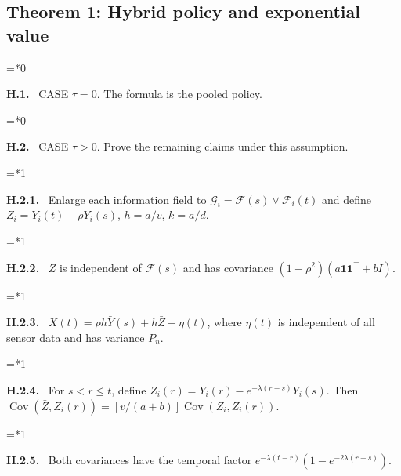 \documentclass[11pt,letterpaper]{article}
\newcommand{\Cov}{\operatorname{Cov}}
\newenvironment{proofstep}[2]{%
  \begin{list}{}{\leftmargin=\dimexpr 0.17in*#2\relax%
  \setlength{\rightmargin}{0pt}\setlength{\topsep}{5pt}\setlength{\parsep}{2pt}}%
  \item[]\textbf{\textcolor{ink}{#1.}}\ }{\end{list}}
\begin{document}
\subsection{Theorem 1: Hybrid policy and exponential value}
\begin{proofstep}{H.1}{0}
CASE $\tau=0$. The formula is the pooled policy.
\par\nopagebreak{}
\end{proofstep}
\begin{proofstep}{H.2}{0}
CASE $\tau>0$. Prove the remaining claims under this assumption.
\par\nopagebreak{}
\end{proofstep}
\begin{proofstep}{H.2.1}{1}
Enlarge each information field to $\mathcal G_i=\mathcal F(s)\vee\mathcal F_i(t)$ and define $Z_i=Y_i(t)-\rho Y_i(s)$, $h=a/v$, $k=a/d$.
\par\nopagebreak{}
\end{proofstep}
\begin{proofstep}{H.2.2}{1}
$Z$ is independent of $\mathcal F(s)$ and has covariance $(1-\rho^2)(a\mathbf1\mathbf1^\top+bI)$.
\par\nopagebreak{}
\end{proofstep}
\begin{proofstep}{H.2.3}{1}
$X(t)=\rho h\bar Y(s)+h\bar Z+\eta(t)$, where $\eta(t)$ is independent of all sensor data and has variance $P_n$.
\par\nopagebreak{}
\end{proofstep}
\begin{proofstep}{H.2.4}{1}
For $s<r\le t$, define $Z_i(r)=Y_i(r)-e^{-\lambda(r-s)}Y_i(s)$. Then $\Cov(\bar Z,Z_i(r))=[v/(a+b)]\Cov(Z_i,Z_i(r))$.
\par\nopagebreak{}
\end{proofstep}
\begin{proofstep}{H.2.5}{1}
Both covariances have the temporal factor $e^{-\lambda(t-r)}(1-e^{-2\lambda(r-s)})$.
\par\nopagebreak{}
\end{proofstep}
\end{document}
